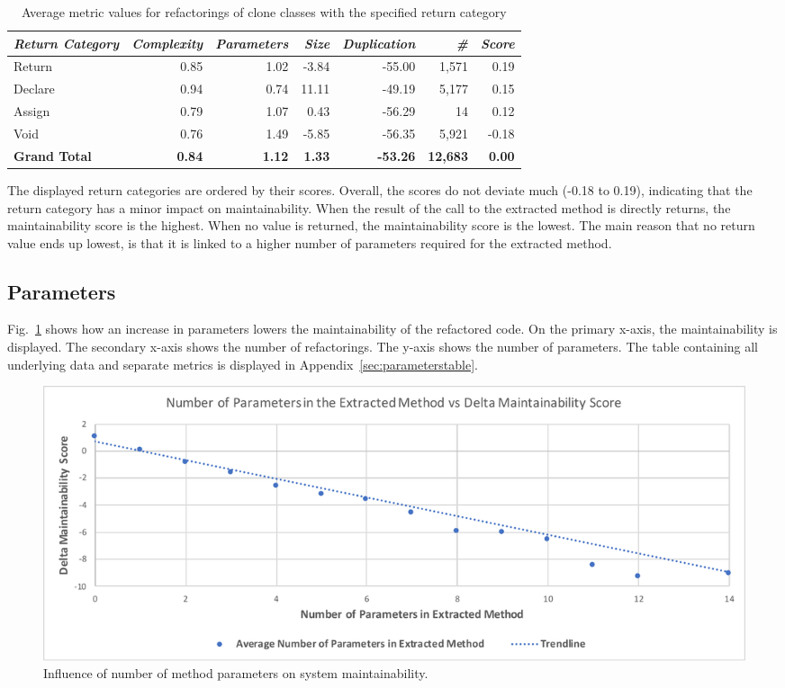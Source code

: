 \begin{table}[H]
\centering
\begin{tabular}{@{}lrrrrrr@{}}
\toprule
\textit{\textbf{Return Category}} & \textit{\textbf{Complexity}} & \textit{\textbf{Parameters}} & \textit{\textbf{Size}} & \textit{\textbf{Duplication}} & \textit{\textbf{\#}} & \textit{\textbf{Score}} \\ \midrule
Return & 0.85 & 1.02 & -3.84 & -55.00 & 1,571 & 0.19 \\
Declare & 0.94 & 0.74 & 11.11 & -49.19 & 5,177 & 0.15 \\
\rowcolor[HTML]{FFCCC9}
Assign & 0.79 & 1.07 & 0.43 & -56.29 & 14 & 0.12 \\
Void & 0.76 & 1.49 & -5.85 & -56.35 & 5,921 & -0.18 \\ \midrule
\textbf{Grand Total} & \textbf{0.84} & \textbf{1.12} & \textbf{1.33} & \textbf{-53.26} & \textbf{12,683} & \textbf{0.00} \\ \bottomrule
\end{tabular}%
\caption{Average metric values for refactorings of clone classes with the specified return category}
\label{tab:return}
\end{table}

The displayed return categories are ordered by their scores. Overall, the scores do not deviate much (-0.18 to 0.19), indicating that the return category has a minor impact on maintainability. When the result of the call to the extracted method is directly returns, the maintainability score is the highest. When no value is returned, the maintainability score is the lowest. The main reason that no return value ends up lowest, is that it is linked to a higher number of parameters required for the extracted method.

\subsection{Parameters}
Fig.~\ref{fig:arguments} shows how an increase in parameters lowers the maintainability of the refactored code. On the primary x-axis, the maintainability is displayed. The secondary x-axis shows the number of refactorings. The y-axis shows the number of parameters. The table containing all underlying data and separate metrics is displayed in Appendix~\ref{sec:parameterstable}.

\begin{figure}[H]
  \centering
  \includegraphics[width=0.8\columnwidth]{img/arguments}
  \caption{Influence of number of method parameters on system maintainability.}
  \label{fig:arguments}
\end{figure}

